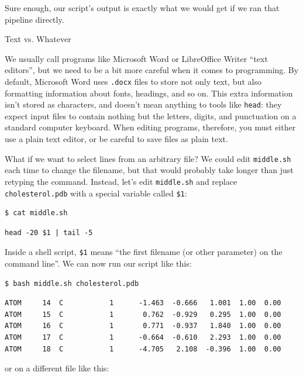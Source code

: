\documentclass{book}
\begin{document}
Sure enough, our script's output is exactly what we would get if we ran
that pipeline directly.

\begin{swcbox}{Text vs. Whatever}

We usually call programs like Microsoft Word or LibreOffice Writer
``text editors'', but we need to be a bit more careful when it comes to
programming. By default, Microsoft Word uses \texttt{.docx} files to
store not only text, but also formatting information about fonts,
headings, and so on. This extra information isn't stored as characters,
and doesn't mean anything to tools like \texttt{head}: they expect input
files to contain nothing but the letters, digits, and punctuation on a
standard computer keyboard. When editing programs, therefore, you must
either use a plain text editor, or be careful to save files as plain
text.

\end{swcbox}

What if we want to select lines from an arbitrary file? We could edit
\texttt{middle.sh} each time to change the filename, but that would
probably take longer than just retyping the command. Instead, let's edit
\texttt{middle.sh} and replace \texttt{cholesterol.pdb} with a special
variable called \texttt{\$1}:

\begin{verbatim}
$ cat middle.sh
\end{verbatim}

\begin{verbatim}
head -20 $1 | tail -5
\end{verbatim}

Inside a shell script, \texttt{\$1} means ``the first filename (or other
parameter) on the command line''. We can now run our script like this:

\begin{verbatim}
$ bash middle.sh cholesterol.pdb
\end{verbatim}

\begin{verbatim}
ATOM     14  C           1      -1.463  -0.666   1.001  1.00  0.00
ATOM     15  C           1       0.762  -0.929   0.295  1.00  0.00
ATOM     16  C           1       0.771  -0.937   1.840  1.00  0.00
ATOM     17  C           1      -0.664  -0.610   2.293  1.00  0.00
ATOM     18  C           1      -4.705   2.108  -0.396  1.00  0.00
\end{verbatim}

or on a different file like this:
\end{document}
